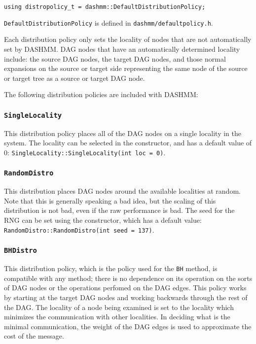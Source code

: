 \begin{verbatim}
using distropolicy_t = dashmm::DefaultDistributionPolicy;
\end{verbatim}

\noindent \texttt{DefaultDistributionPolicy} is defined in
\texttt{dashmm/defaultpolicy.h}.

Each distribution policy only sets the locality of nodes that are not
automatically set by DASHMM. DAG nodes that have an automatically determined
locality include: the source DAG nodes, the target DAG nodes, and those
normal expansions on the source or target side representing the same node of
the source or target tree as a source or target DAG node.

The following distribution policies are included with DASHMM:

\subsubsection{\texttt{SingleLocality}}

This distribution policy places all of the DAG nodes on a single locality in
the system. The locality can be selected in the constructor, and has a default
value of 0: \texttt{SingleLocality::SingleLocality(int loc = 0)}.

\subsubsection{\texttt{RandomDistro}}

This distribution places DAG nodes around the available localities at random.
Note that this is generally speaking a bad idea, but the scaling of this
distribution is not bad, even if the raw performance is bad. The seed for the
RNG can be set using the constructor, which has a default value:
\texttt{RandomDistro::RandomDistro(int seed = 137)}.

\subsubsection{\texttt{BHDistro}}

This distribution policy, which is the policy used for the \texttt{BH} method,
is compatible with any method; there is no dependence on its operation on the
sorts of DAG nodes or the operations perfomed on the DAG edges. This policy
works by starting at the target DAG nodes and working backwards through the
rest of the DAG. The locality of a node being examined is set to the locality
which minimizes the communication with other localities. In deciding what is
the minimal communication, the weight of the DAG edges is used to approximate
the cost of the message.

